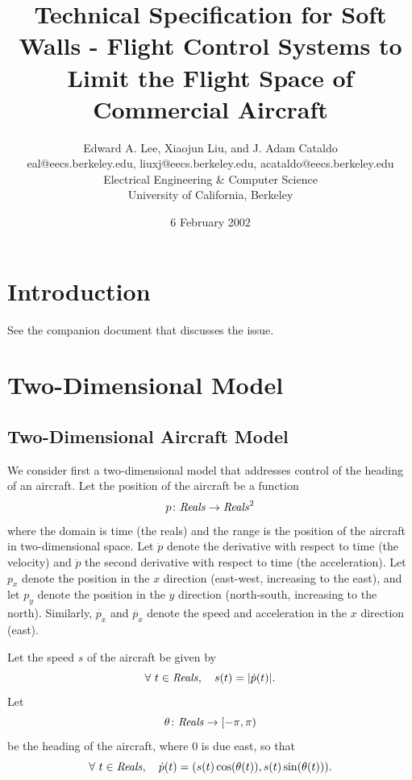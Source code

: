 \documentclass[11pt]{article}
\begin{document}


\title{Technical Specification for Soft Walls -
Flight Control Systems to Limit the Flight Space of Commercial Aircraft}
\author{Edward A. Lee, Xiaojun Liu, and J. Adam Cataldo\\
eal@eecs.berkeley.edu, liuxj@eecs.berkeley.edu, acataldo@eecs.berkeley.edu\\
Electrical Engineering \& Computer Science\\
University of California, Berkeley}
\date{6 February 2002}

\maketitle

\section{Introduction}

See the companion document that discusses the issue.

\section{Two-Dimensional Model}

\subsection{Two-Dimensional Aircraft Model}

We consider first a two-dimensional model that addresses
control of the heading of an aircraft.
Let the position of the aircraft be a function
\[
p \colon \mbox{\textit{Reals}} \to \mbox{\textit{Reals}} ^2
\]
where the domain is
time (the reals) and the range is the position of the aircraft
in two-dimensional space.
Let $\dot{p}$ denote the derivative with respect to time (the
velocity) and $\ddot{p}$ the second derivative with respect to time (the
acceleration). Let $p_x$ denote the position in the $x$ direction (east-west,
increasing to the east), and let $p_y$ denote the position in the $y$ direction
(north-south, increasing to the north). Similarly, $\dot{p_x}$ and $\ddot{p_x}$
denote the speed and acceleration in the $x$ direction (east).

Let the speed $s$ of the aircraft be given by
\[
\forall ~ t \in \mbox{\textit{Reals}}, \quad
s(t) = |\dot{p}(t)| .
\]
Let
\[
\theta \colon \mbox{\textit{Reals}} \to [-\pi, \pi)
\]
be the heading of the aircraft, where 0 is due east, so that
\[
\forall ~ t \in \mbox{\textit{Reals}}, \quad
\dot{p} (t) = (s(t) \cos(\theta (t)), s(t) \sin(\theta(t))) .
\]
\end{document}
